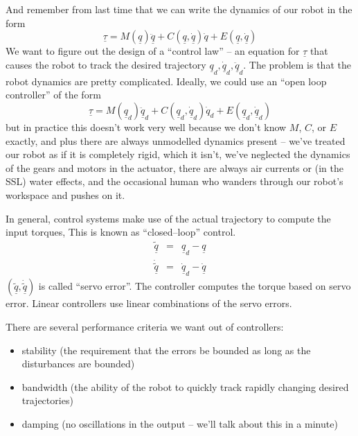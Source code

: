 \documentclass[]{article}
\begin{document}
And remember from last time that we can write the dynamics of our robot in the form
\begin{displaymath}
 \underline{\tau} = M(\underline{q}) \ddot{\underline{q}} +C(\underline{q}, \underline{\dot{q}})\dot{q} + E(\underline{q}, \underline{\dot{q}})
\end{displaymath}
We want to figure out the design of a ``control law'' -- an equation for $\underline{\tau}$ that causes the robot to track the desired trajectory $\underline{q}_{d}, \dot{\underline{q}}_{d}, \ddot{\underline{q}}_{d}$. The problem is that the robot dynamics are pretty complicated. Ideally, we could use an ``open loop controller'' of the form
\begin{displaymath}
 \underline{\tau} = M(\underline{q}_{d}) \ddot{\underline{q}}_{d} +C(\underline{q}_{d}, \underline{\dot{q}}_{d})\dot{q}_{d} + E(\underline{q}_{d}, \underline{\dot{q}}_{d})
\end{displaymath}
but in practice this doesn't work very well because we don't know $M$, $C$, or $E$ exactly, and plus there are always unmodelled dynamics present --  we've treated our robot as if it is completely rigid, which it isn't, we've neglected the dynamics of the gears and motors in the actuator, there are always air currents or (in the SSL) water effects, and the occasional human who wanders through our robot's workspace and pushes on it.

In general, control systems make use of the actual trajectory to compute the input torques, This is known as ``closed--loop'' control.
\begin{eqnarray}
 \underline{\tilde{q}} & = & \underline{q}_{d} - \underline{q} \nonumber\\
 \underline{\dot{\tilde{q}}} & = & \dot{\underline{q}}_{d} - \dot{\underline{q}} \nonumber
\end{eqnarray}
$(\underline{\tilde{q}}, \dot{\tilde{\underline{q}}})$ is called ``servo error''. The controller computes the torque based on servo error. Linear controllers use linear combinations of the servo errors.

There are several performance criteria we want out of controllers:
\begin{itemize}
 \item stability (the requirement that the errors be bounded as long as the disturbances are bounded)
 \item bandwidth (the ability of the robot to quickly track rapidly changing desired trajectories)
 \item damping (no oscillations in the output -- we'll talk about this in a minute)
\end{itemize}
\end{document}
